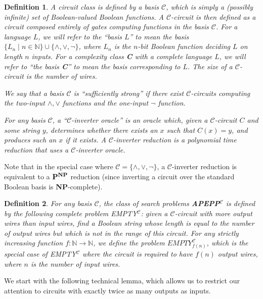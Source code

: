 \documentclass[11pt]{article}
\newtheorem{definition}{Definition}
\def\cl{\bf}
\begin{document}
\begin{definition}
A circuit class is defined by a basis $\mathcal{C}$, which is simply a (possibly infinite) set of Boolean-valued Boolean functions. A $\mathcal{C}$-circuit is then defined as a circuit composed entirely of gates computing functions in the basis $\mathcal{C}$. For a language $L$, we will refer to the ``basis $L$'' to mean the basis $\{L_n \mid n \in \mathbb{N}\} \cup \{\land,\lor,\lnot\}$, where $L_n$ is the $n$-bit Boolean function deciding $L$ on length $n$ inputs. For a complexity class {\cl C} with a complete language $L$, we will refer to ``the basis {\cl C}'' to mean the basis corresponding to $L$. The size of a $\mathcal{C}$-circuit is the number of wires.

We say that a basis $\mathcal{C}$ is ``sufficiently strong'' if there exist $\mathcal{C}$-circuits computing the two-input $\land, \lor$ functions and the one-input $\lnot$ function.

For any basis $\mathcal{C}$, a ``$\mathcal{C}$-inverter oracle'' is an oracle which, given a $\mathcal{C}$-circuit $C$ and some string $y$, determines whether there exists an $x$ such that $C(x)=y$, and produces such an $x$ if it exists. A $\mathcal{C}$-inverter reduction is a polynomial time reduction that uses a $\mathcal{C}$-inverter oracle.
\end{definition}

Note that in the special case where $\mathcal{C} = \{\land, \lor, \lnot\}$, a $\mathcal{C}$-inverter reduction is equivalent to a ${\cl P}^{\cl NP}$ reduction (since inverting a circuit over the standard Boolean basis is {\cl NP}-complete).

\begin{definition}
For any basis $\mathcal{C}$, the class of search problems {\cl APEPP$^{\mathcal{C}}$} is defined by the following complete problem {\sc EMPTY$^{\mathcal{C}}$}: given a $\mathcal{C}$-circuit with more output wires than input wires, find a Boolean string whose length is equal to the number of output wires but which is not in the range of this circuit. For any strictly increasing function $f: \mathbb{N} \rightarrow \mathbb{N}$, we define the problem {\sc $EMPTY^{\mathcal{C}}_{f(n)}$}, which is the special case of {\sc EMPTY$^{\mathcal{C}}$} where the circuit is required to have $f(n)$ output wires, where $n$ is the number of input wires.
\end{definition}

We start with the following technical lemma, which allows us to restrict our attention to circuits with exactly twice as many outputs as inputs.
\end{document}
